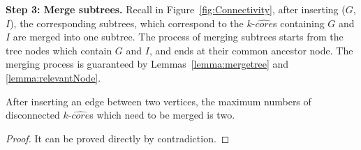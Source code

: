 


\textbf{Step 3: Merge subtrees.}
Recall in Figure~\ref{fig:Connectivity}, after inserting ($G$, $I$), the corresponding subtrees, which correspond to the $k$-$\widehat{core}$s containing $G$ and $I$ are merged into one subtree. The process of merging subtrees starts from the tree nodes which contain $G$ and $I$, and ends at their common ancestor node.
The merging process is guaranteed by Lemmas~\ref{lemma:mergetree} and \ref{lemma:relevantNode}.

\begin{lemma}
\label{lemma:mergetree}
After inserting an edge between two vertices, the maximum numbers of disconnected $k$-$\widehat{core}$s
which need to be merged is two.
\end{lemma}
\begin{proof}
It can be proved directly by contradiction.
\end{proof}

